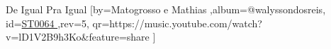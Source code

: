 \beginsong
{De Igual Pra Igual %
}[by={Matogrosso e Mathias %
},album={@walyssondosreis},
id={\href{https://music.youtube.com/watch?v=lD1V2B9h3Ko&feature=share %
}{ST0064 %
}},rev={5}, %
qr={https://music.youtube.com/watch?v=lD1V2B9h3Ko&feature=share %
}]
\beginverse
